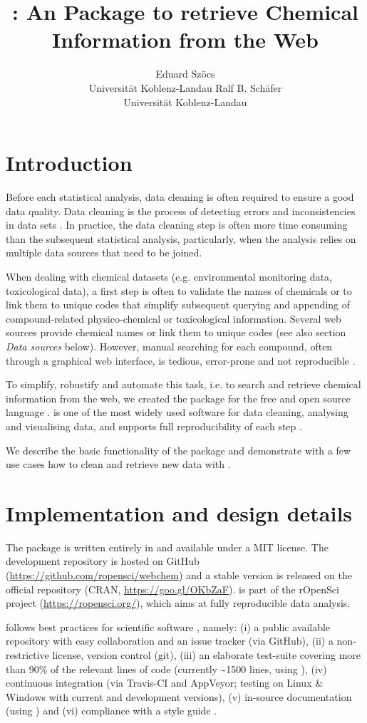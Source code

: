 \documentclass[article, shortnames]{jss}\usepackage[]{graphicx}\usepackage[]{color}
\author{Eduard Sz\"ocs\\Universit\"at Koblenz-Landau \And 
        Ralf B. Sch\"afer\\Universit\"at Koblenz-Landau}
\title{\pkg{webchem}: An \proglang{R} Package to retrieve Chemical Information from the Web}
\begin{document}
\section[Introduction]{Introduction}
Before each statistical analysis, data cleaning is often required to ensure a good data quality.
Data cleaning is the process of detecting errors and inconsistencies in data sets \citep{Chapman_2005}.
In practice, the data cleaning step is often more time consuming than the subsequent statistical analysis, particularly, when the analysis relies on multiple data sources that need to be joined.

When dealing with chemical datasets (e.g. environmental monitoring data, toxicological data), a first step is often to validate the names of chemicals or to link them to unique codes that simplify subsequent querying and appending of compound-related physico-chemical or toxicological information.
Several web sources provide chemical names or link them to unique codes (see also section \emph{Data sources} below).
However, manual searching for each compound, often through a graphical web interface, is tedious, error-prone and not reproducible \citep{Peng_2009}.

To simplify, robustify and automate this task, i.e. to search and retrieve chemical information from the web, we created the  package for the free and open source  language \citep{r_2015, Wehrens_2011}.
 is one of the most widely used software for data cleaning, analysing and visualising data, and supports full reproducibility of each step \citep{Marwick_2016}.

We describe the basic functionality of the package and demonstrate with a few use cases how to clean and retrieve new data with .


\section[Implementation and design details]{Implementation and design details}
The  package is written entirely in  and available under a MIT license.
The development repository is hosted on GitHub (\url{https://github.com/ropensci/webchem}) and a stable version is released on the official  repository (CRAN, \url{https://goo.gl/OKbZaF}).
 is part of the rOpenSci project (\url{https://ropensci.org/}), which aims at fully reproducible data analysis.

 follows best practices for scientific software \citep{wilson_best_2014, poisot_best_2015}, namely: (i) a public available repository with easy collaboration and an issue tracker (via GitHub), (ii) a non-restrictive license, version control (git), (iii) an elaborate test-suite covering more than 90\% of the relevant lines of code (currently \textasciitilde 1500 lines, using  \citep{wickham_testthat:_2011}), (iv) continuous integration (via Travis-CI and AppVeyor; testing on Linux \& Windows with current and development  versions), (v) in-source documentation (using  \citep{wickham_roxygen2:_2015}) and (vi) compliance with a style guide \citep{wickham_advanced_2015}.
\end{document}
